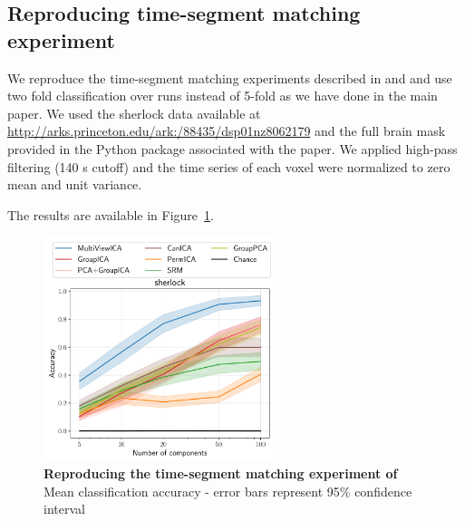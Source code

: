 \documentclass{report}
\begin{document}
{\subsection{Reproducing time-segment matching experiment}
\label{appendix_reproduce}
We reproduce the time-segment matching experiments described in \cite{chen2016convolutional} and \cite{zhang2016searchlight} and use two fold classification over runs instead of 5-fold as we have done in the main paper. We used the sherlock data available at \url{http://arks.princeton.edu/ark:/88435/dsp01nz8062179} and the full brain mask provided in the Python package associated with the paper. We applied high-pass filtering (140 s cutoff) and the time series of each voxel were normalized to zero mean and unit variance.

The results are available in Figure~\ref{fig:supp_timesegment}.

\begin{figure}
  \centering
  \includegraphics[width=0.6\textwidth]{figures/mvica/timesegment_matching_cae.pdf}
  \caption{\textbf{Reproducing the time-segment matching experiment of \cite{chen2016convolutional}~\cite{zhang2016searchlight}} Mean classification accuracy - error bars represent 95\% confidence interval}
  \label{fig:supp_timesegment}
\end{figure}

}
\end{document}
